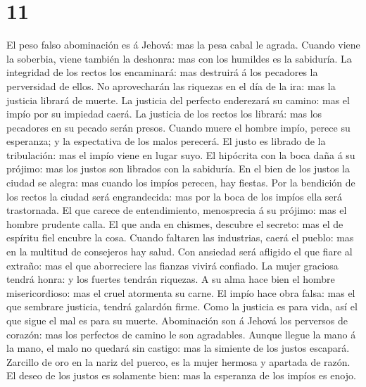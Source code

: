 \hypertarget{section-20-11}{%
\section{11}\label{section-20-11}}

 El peso falso abominación es á Jehová: mas la pesa cabal
le agrada.  Cuando viene la soberbia, viene también la
deshonra: mas con los humildes es la sabiduría.  La
integridad de los rectos los encaminará: mas destruirá á los pecadores
la perversidad de ellos.  No aprovecharán las riquezas en
el día de la ira: mas la justicia librará de muerte.  La
justicia del perfecto enderezará su camino: mas el impío por su impiedad
caerá.  La justicia de los rectos los librará: mas los
pecadores en su pecado serán presos.  Cuando muere el
hombre impío, perece su esperanza; y la espectativa de los malos
perecerá.  El justo es librado de la tribulación: mas el
impío viene en lugar suyo.  El hipócrita con la boca daña
á su prójimo: mas los justos son librados con la sabiduría.
 En el bien de los justos la ciudad se alegra: mas cuando
los impíos perecen, hay fiestas.  Por la bendición de los
rectos la ciudad será engrandecida: mas por la boca de los impíos ella
será trastornada.  El que carece de entendimiento,
menosprecia á su prójimo: mas el hombre prudente calla. 
El que anda en chismes, descubre el secreto: mas el de espíritu fiel
encubre la cosa.  Cuando faltaren las industrias, caerá
el pueblo: mas en la multitud de consejeros hay salud. 
Con ansiedad será afligido el que fiare al extraño: mas el que
aborreciere las fianzas vivirá confiado.  La mujer
graciosa tendrá honra: y los fuertes tendrán riquezas.  A
su alma hace bien el hombre misericordioso: mas el cruel atormenta su
carne.  El impío hace obra falsa: mas el que sembrare
justicia, tendrá galardón firme.  Como la justicia es
para vida, así el que sigue el mal es para su muerte. 
Abominación son á Jehová los perversos de corazón: mas los perfectos de
camino le son agradables.  Aunque llegue la mano á la
mano, el malo no quedará sin castigo: mas la simiente de los justos
escapará.  Zarcillo de oro en la nariz del puerco, es la
mujer hermosa y apartada de razón.  El deseo de los
justos es solamente bien: mas la esperanza de los impíos es enojo.
